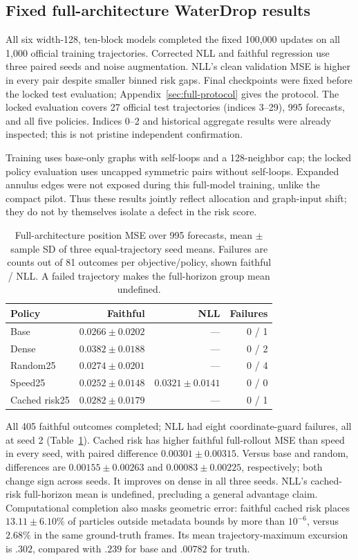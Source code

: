 \subsection{Fixed full-architecture WaterDrop results}
All six width-128, ten-block models completed the fixed 100,000 updates on all
1,000 official training trajectories. Corrected NLL and faithful regression use
three paired seeds and noise augmentation. NLL's clean validation MSE is higher
in every pair despite smaller binned risk gaps. Final checkpoints were fixed
before the locked test evaluation; Appendix~\ref{sec:full-protocol} gives the protocol.
The locked evaluation covers 27 official test trajectories (indices 3--29),
995 forecasts, and all five policies. Indices 0--2 and historical aggregate
results were already inspected; this is not pristine independent confirmation.

Training uses base-only graphs with self-loops and a 128-neighbor cap; the locked
policy evaluation uses uncapped symmetric pairs without self-loops. Expanded
annulus edges were not exposed during this full-model training, unlike the
compact pilot. Thus these results jointly reflect allocation and graph-input
shift; they do not by themselves isolate a defect in the risk score.

\begin{table}[t]
\centering\small
\caption{Full-architecture position MSE over 995 forecasts, mean $\pm$ sample SD of three equal-trajectory seed means. Failures are counts out of 81 outcomes per objective/policy, shown faithful / NLL. A failed trajectory makes the full-horizon group mean undefined.}
\label{tab:full-rollouts}
\begin{tabular}{lrrr}
\toprule
Policy & Faithful & NLL & Failures\\
\midrule
Base & $0.0266\pm0.0202$ & --- & 0 / 1\\
Dense & $0.0382\pm0.0188$ & --- & 0 / 2\\
Random25 & $0.0274\pm0.0201$ & --- & 0 / 4\\
Speed25 & $0.0252\pm0.0148$ & $0.0321\pm0.0141$ & 0 / 0\\
Cached risk25 & $0.0282\pm0.0179$ & --- & 0 / 1\\
\bottomrule
\end{tabular}
\end{table}

All 405 faithful outcomes completed; NLL had eight coordinate-guard failures,
all at seed 2 (Table~\ref{tab:full-rollouts}). Cached risk has higher faithful
full-rollout MSE than speed in every seed, with paired difference
$0.00301\pm0.00315$. Versus base and random, differences are
$0.00155\pm0.00263$ and $0.00083\pm0.00225$, respectively; both change sign
across seeds. It improves on dense in all three seeds. NLL's cached-risk
full-horizon mean is undefined, precluding a general advantage claim.
Computational completion also masks geometric error: faithful cached risk
places $13.11\pm6.10\%$ of particles outside metadata bounds by more than
$10^{-6}$, versus $2.68\%$ in the same ground-truth frames. Its mean trajectory-maximum
excursion is $.302$, compared with $.239$ for base and $.00782$ for truth.

